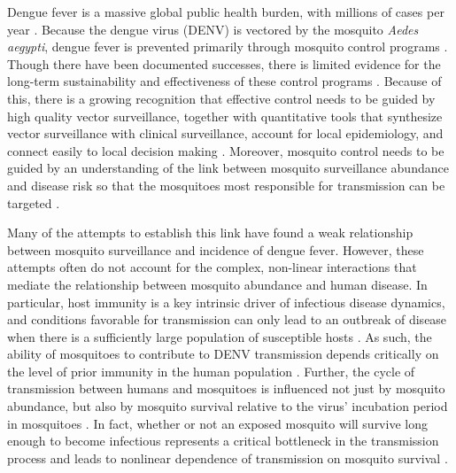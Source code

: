 \documentclass[10pt,letterpaper]{article}
\begin{document}
Dengue fever is a massive global public health burden, with millions of cases per year \cite{Bhatt2013}.  
Because the dengue virus (DENV) is vectored by the mosquito \textit{Aedes aegypti}, dengue fever is prevented primarily through mosquito control programs \cite{Achee2015}.
Though there have been documented successes, there is limited evidence for the long-term sustainability and effectiveness of these control programs \cite{Morrison2008}.
Because of this, there is a growing recognition that effective control needs to be guided by high quality vector surveillance, together with quantitative tools that synthesize vector surveillance with clinical surveillance, account for local epidemiology, and connect easily to local decision making \cite{Morrison2008, Scott2010b}.
Moreover, mosquito control needs to be guided by an understanding of the link between mosquito surveillance abundance and disease risk so that the mosquitoes most responsible for transmission can be targeted \cite{Scott2010a, Scott2010b}.

Many of the attempts to establish this link have found a weak relationship between mosquito surveillance and incidence of dengue fever\cite{Bowman2014, Pepin2015, Cromwell2017}.
However, these attempts often do not account for the complex, non-linear interactions that mediate the relationship between mosquito abundance and human disease.
In particular, host immunity is a key intrinsic driver of infectious disease dynamics, and conditions favorable for transmission can only lead to an outbreak of disease when there is a sufficiently large population of susceptible hosts \cite{Koelle2004, Koelle2005}.
As such, the ability of mosquitoes to contribute to DENV transmission depends critically on the level of prior immunity in the human population \cite{Scott2010a}.
Further, the cycle of transmission between humans and mosquitoes is influenced not just by mosquito abundance, but also by mosquito survival relative to the virus' incubation period in mosquitoes \cite{Smith2012}.
In fact, whether or not an exposed mosquito will survive long enough to become infectious represents a critical bottleneck in the transmission process and leads to nonlinear dependence of transmission on mosquito survival \cite{Smith2012}.
\end{document}
